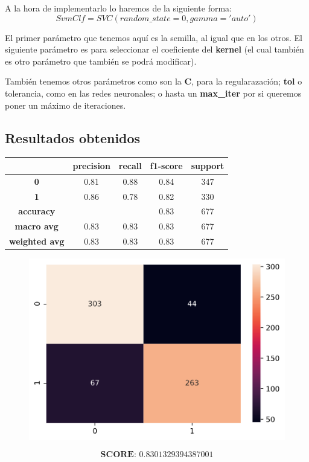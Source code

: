 \documentclass[11pt,a4paper]{article}
\begin{document}
A la hora de implementarlo lo haremos de la siguiente forma:
$$SvmClf = SVC(random\_state=0, gamma='auto')$$

El primer parámetro que tenemos aquí es la semilla, al igual que en los otros. El siguiente parámetro es para seleccionar
el coeficiente del \textbf{kernel} (el cual también es otro parámetro que también se podrá modificar).

También tenemos otros parámetros como son la \textbf{C}, para la regularazación; \textbf{tol} o tolerancia, como en las redes
neuronales; o hasta un \textbf{max\_iter} por si queremos poner un máximo de iteraciones.

\subsection*{Resultados obtenidos}
\begin{table}[H]
    \centering
    \begin{tabular}{c|cccc}
        \textbf{} & \textbf{precision} & \textbf{recall} & \textbf{f1-score} & \textbf{support} \\ \hline
        \textbf{0} & 0.81 & 0.88 & 0.84 & 347 \\
        \textbf{1} & 0.86 & 0.78 & 0.82 & 330 \\ \hline
        \textbf{accuracy} & & & 0.83 & 677 \\
        \textbf{macro avg} & 0.83 & 0.83 & 0.83 & 677 \\
        \textbf{weighted avg} & 0.83 & 0.83 & 0.83 & 677
    \end{tabular}
\end{table}

\begin{figure}[H]
    \centering
    \includegraphics[scale=0.5]{img/matrix-neuralnetwork.png}    
\end{figure}
$$\textbf{SCORE:  } 0.8301329394387001$$
\end{document}
